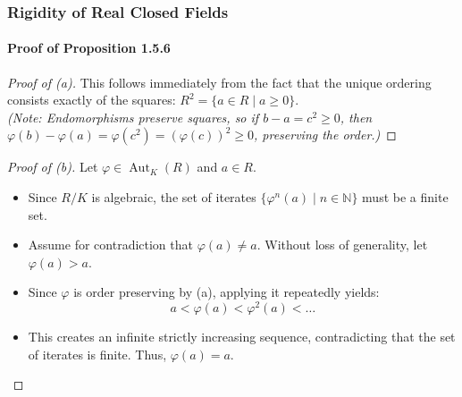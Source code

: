 \documentclass[11pt]{beamer}
\begin{document}
\begin{frame}
    \frametitle{Rigidity of Real Closed Fields}
    \framesubtitle{Proof of Proposition 1.5.6}

    \vspace{-0.4em}
    \begin{proof}[Proof of (a)]
        This follows immediately from the fact that the unique ordering consists exactly of the squares: $R^2 = \{a \in R \mid a \geq 0\}$. \\
        \vspace{0.2em}
        \footnotesize{\textit{(Note: Endomorphisms preserve squares, so if $b-a = c^2 \geq 0$, then $\varphi(b) - \varphi(a) = \varphi(c^2) = (\varphi(c))^2 \geq 0$, preserving the order.)}}
    \end{proof}

    \vspace{-0.4em}

    \begin{proof}[Proof of (b)]
        Let $\varphi \in \operatorname{Aut}_K(R)$ and $a \in R$. 
        \begin{itemize}
            \item Since $R/K$ is algebraic, the set of iterates $\{\varphi^n(a) \mid n \in \mathbb{N}\}$ must be a finite set.
            \item Assume for contradiction that $\varphi(a) \neq a$. Without loss of generality, let $\varphi(a) > a$.
            \item Since $\varphi$ is order preserving by (a), applying it repeatedly yields:
            \[ a < \varphi(a) < \varphi^2(a) < \dots \]
            \item This creates an infinite strictly increasing sequence, contradicting that the set of iterates is finite. Thus, $\varphi(a) = a$. \qedhere
        \end{itemize}
    \end{proof}
\end{frame}
\end{document}
